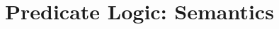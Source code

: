 \documentclass[../logic-text.tex]{subfiles}
\begin{document}
\chapter{Predicate Logic: Semantics}
\label{cha:pred-logic:-semant}
\end{document}
